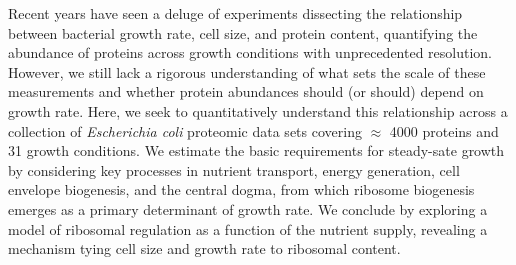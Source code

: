 Recent years have seen a deluge of experiments dissecting the relationship
between bacterial growth rate, cell size, and protein content, quantifying the
abundance of proteins across growth conditions with unprecedented
resolution. However, we still lack a rigorous understanding of what sets the
scale of these measurements and whether protein abundances should (or should)
depend on growth rate. Here, we seek to quantitatively understand this
relationship across a collection of
\textit{Escherichia coli} proteomic data sets covering $\approx$ 4000 proteins
and 31 growth conditions. We estimate the basic requirements for steady-sate
growth by considering key processes in nutrient transport, energy generation, cell envelope
biogenesis, and the central dogma, from which ribosome biogenesis
emerges as a primary determinant of growth rate. We conclude by exploring a
model of ribosomal regulation as a function of the nutrient supply, revealing a
mechanism tying cell size and growth rate to ribosomal content.
